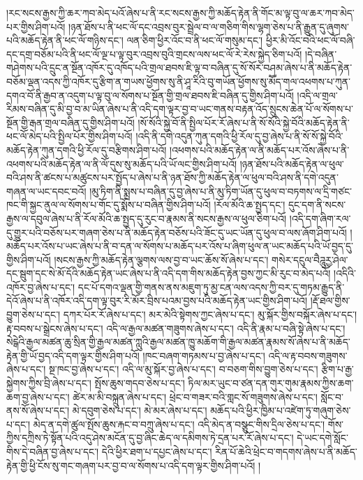 །རང་སངས་རྒྱས་ཀྱི་ཆར་ཀབ་མེད་པའོ་ཞེས་པ་ནི་རང་སངས་རྒྱས་ཀྱི་མཆོད་རྟེན་ནི་གོང་མ་ལྟ་བུ་ལ་ཆར་ཀབ་མེད་པར་གྱིས་ཤིག་པའོ། །ཉན་ཐོས་པ་ནི་ཕང་ལོ་དང་འབྲས་བུར་སྦྲེལ་བ་ལ་གཅིག་གིས་ལྷག་ཅེས་པ་ནི་རྒྱུན་དུ་ཞུགས་པའི་མཆོད་རྟེན་ནི་ཕང་ལོ་གཉིས་དང་། ལན་ཅིག་ཕྱིར་འོང་བ་ནི་ཕང་ལོ་གསུམ་དང་། ཕྱིར་མི་འོང་བའི་ཕང་ལོ་བཞི་དང་དགྲ་བཅོམ་པའི་ནི་ཕང་ལོ་ལྔ་པ་ལྟ་བུར་འབྲས་བུའི་གྲངས་ལས་ཕང་ལོ་རེ་རེས་སྐྱེད་ཅིག་པའོ། །དེ་བཞིན་གཤེགས་པའི་དྲུང་ན་སྔོན་འཁོར་དུ་འཁོད་པའི་གྲལ་ཐབས་ཇི་ལྟ་བ་བཞིན་དུ་སོ་སོར་བཤམ་ཞེས་པ་ནི་མཆོད་རྟེན་བཅོམ་ལྡན་འདས་ཀྱི་འཁོར་དུ་རྩིག་ན་གཡས་ཕྱོགས་སུ་ནི་ཤཱ་རིའི་བུ་གཡོན་ཕྱོགས་སུ་མཽད་གལ་འཕགས་པ་ཀུན་དགའ་བོ་ནི་རྒྱབ་ན་འདུག་པ་ལྟ་བུ་ལ་སོགས་པ་སྔོན་གྱི་གྲལ་ཐབས་ཇི་བཞིན་དུ་གྱིས་ཤིག་པའོ། །འདི་ལ་གྲལ་རིམས་བཞིན་དུ་མི་བྱ་བ་མ་ཡིན་ཞེས་པ་ནི་འདི་དག་ལྟར་བྱ་བ་ཡང་གནས་བརྟན་འོད་སྲུངས་ཆེན་པོ་ལ་སོགས་པ་སྔོན་གྱི་རྒན་གྲལ་བཞིན་དུ་གྱིས་ཤིག་པའོ། །སོ་སོའི་སྐྱེ་བོ་ནི་སྤྱིལ་པོར་རོ་ཞེས་པ་ནི་སོ་སོའི་སྐྱེ་བོའི་མཆོད་རྟེན་ནི་ཕང་ལོ་མེད་པའི་སྤྱིལ་པོར་གྱིས་ཤིག་པའོ། །འདི་ནི་དགེ་འདུན་ཀུན་དགའི་ཕྱི་རོལ་དུ་བྱ་ཞེས་པ་ནི་སོ་སོ་སྐྱེ་བོའི་མཆོད་རྟེན་ཀུན་དགའི་ཕྱི་རོལ་དུ་བརྩིགས་ཤིག་པའོ། །འཕགས་པའི་མཆོད་རྟེན་ལ་ནི་མཆོད་པར་འོས་ཞེས་པ་ནི་འཕགས་པའི་མཆོད་རྟེན་ལ་ནི་ལོ་དུས་སུ་མཆོད་པའི་ཡོ་ལང་གྱིས་ཤིག་པའོ། །ཉན་ཐོས་པའི་མཆོད་རྟེན་ལ་ཕུལ་བའི་ཤས་ནི་ཚངས་པ་མཚུངས་པར་སྤྱོད་པ་ཞེས་པ་ནི་ཉན་ཐོས་ཀྱི་མཆོད་རྟེན་ལ་ཕུལ་བའི་ཤས་ནི་དགེ་འདུན་གཞན་ལ་ཡང་དབང་བའོ། །མུ་ཏིག་ནི་སྨྲས་པ་བཞིན་དུ་བྱ་ཞེས་པ་ནི་མུ་ཏིག་ཡོན་དུ་ཕུལ་བ་བཏགས་ལ་དྲི་གཙང་ཁང་གི་སྐྱང་ནུལ་ལ་སོགས་པ་གོང་དུ་སྨོས་པ་བཞིན་གྱིས་ཤིག་པའོ། །རོལ་མོའི་ཆ་སྤྱད་དང་། དུང་དག་ནི་སངས་རྒྱས་ལ་དབུལ་ཞེས་པ་ནི་རོལ་མོའི་ཆ་སྤྱད་དུ་རུང་བ་རྣམས་ནི་སངས་རྒྱས་ལ་ཕུལ་ཅིག་པའོ། །འདི་དག་ཞིག་རལ་དུ་གྱུར་པའི་བཅོས་པར་གཞག་ཅེས་པ་ནི་མཆོད་རྟེན་བཅོས་པའི་ཟོང་དུ་ཡང་ཡོན་དུ་ཕུལ་བ་ལས་ཞོག་ཤིག་པའོ། །མཆོད་པར་འོས་པ་ཡང་ཞེས་པ་ནི་བ་དན་ལ་སོགས་པ་མཆོད་པར་འོས་པ་ཞིག་ཕུལ་ན་ཡང་མཆོད་པའི་ཡོ་བྱད་དུ་གྱིས་ཤིག་པའོ། །སངས་རྒྱས་ཀྱི་མཆོད་རྟེན་ལྕགས་ལས་བྱ་བ་ཡང་ཆོས་སོ་ཞེས་པ་དང་། གསེར་དངུལ་བཻཌཱུརྱ་ཤེལ་དང་སྦུག་དང་སེ་མོ་དོའི་མཆོད་རྟེན་ཡང་ཞེས་པ་ནི་འདི་དག་གིས་མཆོད་རྟེན་བྱས་ཀྱང་མི་རུང་བ་མེད་པའོ། །འདིའི་འཁོར་བྱ་ཞེས་པ་དང་། དང་པོ་དགའ་ལྡན་གྱི་གནས་ནས་མཇུག་ཏུ་མྱ་ངན་ལས་འདས་ཀྱི་བར་དུ་གཏམ་རྒྱུད་ནི་དེའོ་ཞེས་པ་ནི་འཁོར་འདི་དག་ལྟ་བུར་རི་མོར་བྲིས་པའམ་བྱས་པའི་མཆོད་རྟེན་ཡང་གྱིས་ཤིག་པའོ། །རྡོ་ཐལ་གྱིས་བྱུག་ཅེས་པ་དང་། དཀར་པོར་རོ་ཞེས་པ་དང་། མར་མེའི་སྟེགས་ཀྱང་ཞེས་པ་དང་། མུ་སྐོར་གྱིས་བསྐོར་ཞེས་པ་དང་། རྟ་བབས་པ་སྒྲེངས་ཞེས་པ་དང་། འདི་ལ་རྒྱལ་མཚན་གཟུགས་ཞེས་པ་དང་། འདི་ནི་རྣམ་པ་བཞི་སྟེ་ཞེས་པ་དང་། སེངྒེའི་རྒྱལ་མཚན་ཆུ་སྲིན་གྱི་རྒྱལ་མཚན་ཀླུའི་རྒྱལ་མཚན་ཁྱུ་མཆོག་གི་རྒྱལ་མཚན་རྣམས་སོ་ཞེས་པ་ནི་མཆོད་རྟེན་གྱི་ཡོ་བྱད་འདི་དག་ལྟར་གྱིས་ཤིག་པའོ། །ཁང་བཞག་གཏམས་པ་བྱ་ཞེས་པ་དང་། འདི་ལ་རྟ་བབས་གཟུགས་ཞེས་པ་དང་། སྔ་ཁང་བྱ་ཞེས་པ་དང་། འདི་ལ་མུ་སྐོར་བྱ་ཞེས་པ་དང་། བ་བཅག་གིས་བྱུག་ཅེས་པ་དང་། རྩིག་པ་རྒྱ་སྐྱེགས་ཀྱིས་བྲི་ཞེས་པ་དང་། སྤོས་ཆུས་གདབ་ཅེས་པ་དང་། ཏིལ་མར་ཡུང་བ་ཙན་དན་གུར་གུམ་རྣམས་ཀྱིས་ཆག་ཆག་བྱ་ཞེས་པ་དང་། ཚེར་མ་མི་བསྐྲུན་ཞེས་པ་དང་། ཕྲེང་བ་གཟར་བའི་གླང་སོ་གཟུགས་ཞེས་པ་དང་། སློང་བ་ནས་སོ་ཞེས་པ་དང་། མེ་དབུག་ཅེས་པ་དང་། མེ་མར་ཞེས་པ་དང་། མཆོད་པའི་ཕྱིར་ཁྱིམ་པ་འཛེག་ཏུ་གཞུག་ཅེས་པ་དང་། མེད་ན་དགེ་ཚུལ་སྤོས་ཆུས་རྐང་བ་བཀྲུ་ཞེས་པ་དང་། འདི་མེད་ན་བསྩུང་གིས་དྲིལ་ཅེས་པ་དང་། གོས་ཀྱིས་དཀྲིས་ཏེ་སྟོན་པའི་འདུ་ཤེས་མངོན་དུ་བྱ་ཞིང་ཆེད་ལ་དམིགས་ཏེ་དྲན་པར་རོ་ཞེས་པ་དང་། དེ་ཡང་དགེ་སློང་གིས་དེ་བཞིན་བྱ་ཞེས་པ་དང་། དེའི་ཕྱིར་ཐག་པ་དཔྱང་ཞེས་པ་དང་། རིན་པོ་ཆེའི་ཕྲེང་བ་གདགས་ཞེས་པ་ནི་མཆོད་རྟེན་གྱི་ཕྱི་ངོས་སུ་གང་གཞག་པར་བྱ་བ་ལ་སོགས་པ་འདི་དག་ལྟར་གྱིས་ཤིག་པའོ། །
